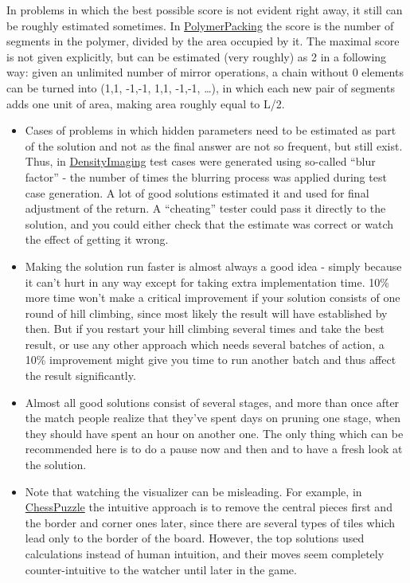 \documentclass[]{article}
\begin{document}
In problems in which the best possible score is not evident right away,
it still can be roughly estimated sometimes. In
\href{http://www.topcoder.com/longcontest/?module=ViewProblemStatement\&rd=14264\&pm=10918}{PolymerPacking}
the score is the number of segments in the polymer, divided by the area
occupied by it. The maximal score is not given explicitly, but can be
estimated (very roughly) as 2 in a following way: given an unlimited
number of mirror operations, a chain without 0 elements can be turned
into (1,1, -1,-1, 1,1, -1,-1, \ldots{}), in which each new pair of
segments adds one unit of area, making area roughly equal to L/2.

\begin{itemize}
\item
  Cases of problems in which hidden parameters need to be estimated as
  part of the solution and not as the final answer are not so frequent,
  but still exist. Thus, in
  \href{http://www.topcoder.com/longcontest/?module=ViewProblemStatement\&rd=10722\&pm=7548}{DensityImaging}
  test cases were generated using so-called ``blur factor'' - the number
  of times the blurring process was applied during test case generation.
  A lot of good solutions estimated it and used for final adjustment of
  the return. A ``cheating'' tester could pass it directly to the
  solution, and you could either check that the estimate was correct or
  watch the effect of getting it wrong.
\item
  Making the solution run faster is almost always a good idea - simply
  because it can't hurt in any way except for taking extra
  implementation time. 10\% more time won't make a critical improvement
  if your solution consists of one round of hill climbing, since most
  likely the result will have established by then. But if you restart
  your hill climbing several times and take the best result, or use any
  other approach which needs several batches of action, a 10\%
  improvement might give you time to run another batch and thus affect
  the result significantly.
\item
  Almost all good solutions consist of several stages, and more than
  once after the match people realize that they've spent days on pruning
  one stage, when they should have spent an hour on another one. The
  only thing which can be recommended here is to do a pause now and then
  and to have a fresh look at the solution.
\item
  Note that watching the visualizer can be misleading. For example, in
  \href{https://community.topcoder.com/longcontest/?module=ViewProblemStatement\&rd=14195\&pm=10728}{ChessPuzzle}
  the intuitive approach is to remove the central pieces first and the
  border and corner ones later, since there are several types of tiles
  which lead only to the border of the board. However, the top solutions
  used calculations instead of human intuition, and their moves seem
  completely counter-intuitive to the watcher until later in the game.
\end{itemize}
\end{document}
